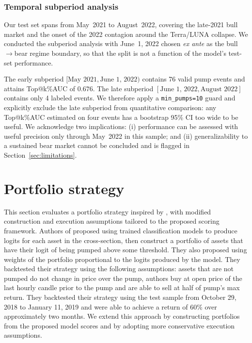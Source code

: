 \documentclass{ieeeaccess}
\begin{document}
\subsubsection{Temporal subperiod analysis}
Our test set spans from May~2021 to August~2022, covering the late-2021 bull market and the onset of the 2022 contagion around the Terra/LUNA collapse. We conducted the subperiod analysis with June~1, 2022 chosen \emph{ex ante} as the bull$\rightarrow$bear regime boundary, so that the split is not a function of the model's test-set performance.

The early subperiod $[\text{May 2021},\text{June 1, 2022})$ contains 76 valid pump events and attains Top@k\%AUC of $0.676$. The late subperiod $[\text{June 1, 2022},\text{August 2022}]$ contains only 4 labeled events. We therefore apply a \texttt{min\_pumps=10} guard and explicitly exclude the late subperiod from quantitative comparison: any Top@k\%AUC estimated on four events has a bootstrap 95\% CI too wide to be useful. We acknowledge two implications: (i) performance can be assessed with useful precision only through May~2022 in this sample; and (ii) generalizability to a sustained bear market cannot be concluded and is flagged in Section~\ref{sec:limitations}.

\section{Portfolio strategy}
\label{sec:portfolio}

This section evaluates a portfolio strategy inspired by \cite{pd_anatomy}, with modified construction and execution assumptions tailored to the proposed scoring framework. Authors of \cite{pd_anatomy} proposed using trained classification models to produce logits for each asset in the cross-section, then construct a portfolio of assets that have their logit of being pumped above some threshold. They also proposed using weights of the portfolio proportional to the logits produced by the model. They backtested their strategy using the following assumptions: assets that are not pumped do not change in price over the pump, authors buy at open price of the last hourly candle prior to the pump and are able to sell at half of pump's max return. They backtested their strategy using the test sample from October 29, 2018 to January 11, 2019 and were able to achieve a return of 60\% over approximately two months. We extend this approach by constructing portfolios from the proposed model scores and by adopting more conservative execution assumptions. 
\end{document}
